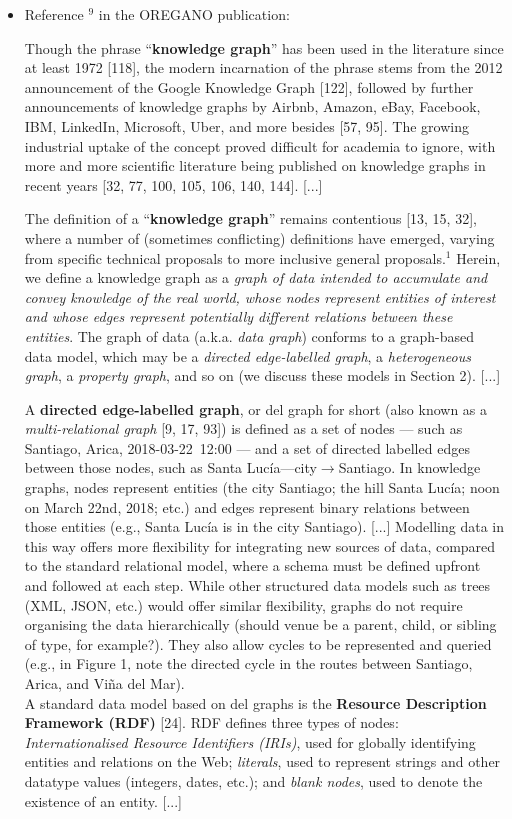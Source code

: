 \documentclass{article}
\begin{document}
\begin{itemize}
\item Reference $^9$ in the OREGANO publication:
\begin{displayquote}
Though the phrase “\textbf{knowledge graph}” has been used in the literature since at least 1972 [118], the modern incarnation of the phrase stems from the 2012 announcement of the Google Knowledge Graph [122], followed by further announcements of knowledge graphs by Airbnb, Amazon, eBay, Facebook, IBM, LinkedIn, Microsoft, Uber, and more besides [57, 95]. The growing industrial uptake of the concept proved difficult for academia to ignore, with more and more scientific literature being published on knowledge graphs in recent years [32, 77, 100, 105, 106, 140, 144]. [...]

The definition of a “\textbf{knowledge graph}” remains contentious [13, 15, 32], where a number of (sometimes conflicting) definitions have emerged, varying from specific technical proposals to more inclusive general proposals.$^1$ Herein, we define a knowledge graph as a \textit{graph of data intended to accumulate and convey knowledge of the real world, whose nodes represent entities of interest and whose edges represent potentially different relations between these entities}. The graph of data (a.k.a. \textit{data graph}) conforms to a graph-based data model, which may be a \textit{directed edge-labelled graph}, a \textit{heterogeneous graph}, a \textit{property graph}, and so on (we discuss these models in Section 2).
[...]

A \textbf{directed edge-labelled graph}, or del graph for short (also known as a \textit{multi-relational graph} [9, 17, 93]) is defined as a set of nodes — such as Santiago, Arica, 2018-03-22~12:00 — and a set of directed labelled edges between those nodes, such as Santa Lucía—city$\rightarrow$Santiago. In knowledge graphs, nodes represent entities (the city Santiago; the hill Santa Lucía; noon on March 22nd, 2018; etc.) and edges represent binary relations between those entities (e.g., Santa Lucía is in the city Santiago). [...] Modelling data in this way offers more flexibility for integrating new sources of data, compared to the standard relational model, where a schema must be defined upfront and followed at each step. While other structured data models such as trees (XML, JSON, etc.) would offer similar flexibility, graphs do not require organising the data hierarchically (should venue be a parent, child, or sibling of type, for example?). They also allow cycles to be represented and queried (e.g., in Figure 1, note the directed cycle in the routes between Santiago, Arica, and Viña del Mar).\\
A standard data model based on del graphs is the \textbf{Resource Description Framework (RDF)} [24]. RDF defines three types of nodes: \textit{Internationalised Resource Identifiers (IRIs)}, used for globally identifying entities and relations on the Web; \textit{literals}, used to represent strings and other datatype values (integers, dates, etc.); and \textit{blank nodes}, used to denote the existence of an entity.
[...]


\end{displayquote}
\end{itemize}
\end{document}
